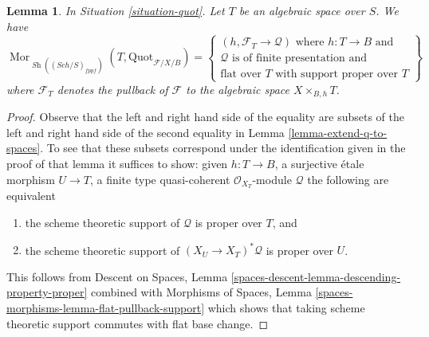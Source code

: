 \documentclass{stacks-project}
\theoremstyle{plain}
\newtheorem{lemma}[subsection]{Lemma}
\theoremstyle{definition}
\theoremstyle{remark}
\numberwithin{equation}{subsection}
\def\Sch{\mathit{Sch}}
\def\Mor{\mathop{\mathrm{Mor}}\nolimits}
\def\Sh{\mathop{\mathit{Sh}}\nolimits}
\def\Quotfunctor{\mathrm{Quot}}
\begin{document}
\begin{lemma}
\label{lemma-extend-quot-to-spaces}
In Situation \ref{situation-quot}. Let $T$ be an algebraic space over $S$.
We have
$$
\Mor_{\Sh((\Sch/S)_{fppf})}(T,  \Quotfunctor_{\mathcal{F}/X/B}) =
\left\{
\begin{matrix}
(h, \mathcal{F}_T \to \mathcal{Q}) \text{ where }
h : T \to B \text{ and}\\
\mathcal{Q}\text{ is of finite presentation and}\\
\text{flat over }T\text{ with support proper over }T
\end{matrix}
\right\}
$$
where $\mathcal{F}_T$ denotes the pullback of $\mathcal{F}$
to the algebraic space $X \times_{B, h} T$.
\end{lemma}

\begin{proof}
Observe that the left and right hand side of the equality are
subsets of the left and right hand side of the second equality in
Lemma \ref{lemma-extend-q-to-spaces}.
To see that these subsets correspond under
the identification given in the proof of that lemma
it suffices to show: given $h : T \to B$,
a surjective \'etale morphism $U \to T$,
a finite type quasi-coherent $\mathcal{O}_{X_T}$-module $\mathcal{Q}$
the following are equivalent
\begin{enumerate}
\item the scheme theoretic support of $\mathcal{Q}$ is proper
over $T$, and
\item the scheme theoretic support of $(X_U \to X_T)^*\mathcal{Q}$
is proper over $U$.
\end{enumerate}
This follows from
Descent on Spaces, Lemma \ref{spaces-descent-lemma-descending-property-proper}
combined with
Morphisms of Spaces, Lemma \ref{spaces-morphisms-lemma-flat-pullback-support}
which shows that taking scheme theoretic support commutes
with flat base change.
\end{proof}
\end{document}

